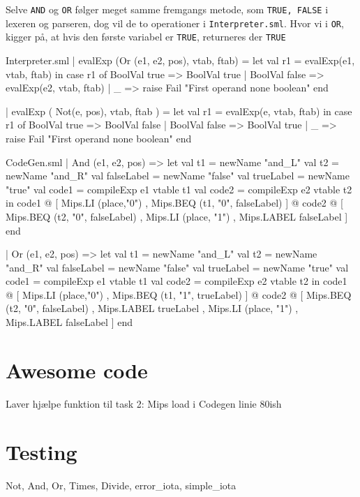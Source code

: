 \documentclass[11pt,a4paper,oneside]{report}
\begin{document}
Selve \texttt{AND} og \texttt{OR} følger meget samme fremgangs metode, som \texttt{TRUE, FALSE} i lexeren og parseren, dog vil de to operationer i \texttt{Interpreter.sml}. Hvor vi i \texttt{OR}, kigger på, at hvis den første variabel er \texttt{TRUE}, returneres der \texttt{TRUE}

\begin{code}[firstnumber=190]{Interpreter.sml}
| evalExp (Or (e1, e2, pos), vtab, ftab) =
        let
          val r1 = evalExp(e1, vtab, ftab)
        in
          case r1 of
               BoolVal true => BoolVal true
             | BoolVal false  => evalExp(e2, vtab, ftab)
             | _ => raise Fail "First operand none boolean"
        end

  | evalExp ( Not(e, pos), vtab, ftab ) =
        let
          val r1 = evalExp(e, vtab, ftab)
        in
          case r1 of
               BoolVal true => BoolVal false
             | BoolVal false  => BoolVal true
             | _ => raise Fail "First operand none boolean"
        end
\end{code}

\begin{code}[firstnumber=408]{CodeGen.sml}
  | And (e1, e2, pos) =>
    let val t1 = newName "and_L"
        val t2 = newName "and_R"
        val falseLabel = newName "false"
        val trueLabel = newName "true"
        val code1 = compileExp e1 vtable t1
        val code2 = compileExp e2 vtable t2
    in
      code1 @
      [ Mips.LI (place,"0")
      , Mips.BEQ (t1, "0", falseLabel) ]
      @ code2 @
      [ Mips.BEQ (t2, "0", falseLabel)
      , Mips.LI (place, "1")
      , Mips.LABEL falseLabel ]
    end

  | Or (e1, e2, pos) =>
    let val t1 = newName "and_L"
        val t2 = newName "and_R"
        val falseLabel = newName "false"
        val trueLabel = newName "true"
        val code1 = compileExp e1 vtable t1
        val code2 = compileExp e2 vtable t2
    in
            code1 @
            [ Mips.LI (place,"0")
            , Mips.BEQ (t1, "1", trueLabel) ]
            @ code2 @
            [ Mips.BEQ (t2, "0", falseLabel)
            , Mips.LABEL trueLabel
            , Mips.LI (place, "1")
            , Mips.LABEL falseLabel ]    end
\end{code}

\section{Awesome code}
Laver hjælpe funktion til task 2: Mips load i Codegen linie 80ish

\section{Testing}
Not, And, Or, Times, Divide, error\_iota, simple\_iota




\end{document}
